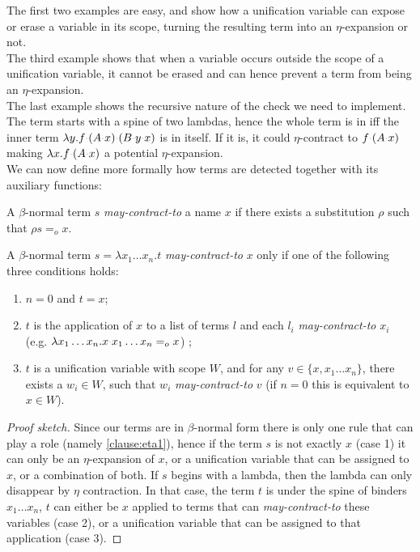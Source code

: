 \documentclass[sigconf,natbib=false,review]{acmart}
\newcommand{\appsep}{\ensuremath{\textcolor{lightgray}{\cdot}}}
\newcommand{\EqualRel}{\ensuremath{=}}
\newcommand{\Eo}{\ensuremath{\EqualRel_o}\xspace}
\begin{document}
\noindent
The first two examples are easy, and show how a unification variable can expose
or erase a variable in its scope, turning the resulting term into an $\eta$-expansion or not.\\
The third example shows that when a variable occurs outside the scope of a unification
variable, it cannot be erased and can hence prevent a term from being an $\eta$-expansion.\\
The last example shows the recursive nature of the check we need to implement.
The term starts with a spine of two lambdas, hence the whole term
is in \maybeeta iff the inner term $\lambda y.f\appsep (A \appsep x) \appsep (B \appsep y \appsep x)$
is in \maybeeta itself. If it is, it could $\eta$-contract to
$f \appsep (A \appsep x)$ making $\lambda x.f \appsep (A \appsep x)$ a potential
$\eta$-expansion.\\
We can now define more formally how \maybeeta terms are detected together with
its auxiliary functions:

\newcommand{\reduceto}{\emph{may-contract-to}}
\begin{definition}[\reduceto]
  A $\beta$-normal term $s$ \reduceto{} a name $x$ if there exists a
  substitution $\rho$ such that $\rho s \Eo{} x$.
\end{definition}

\begin{lemma}\label{lem:reduceto}
A $\beta$-normal term $s = \lambda x_1 \ldots x_n.t$
\reduceto{} $x$ only if one of the following three conditions holds:
\begin{enumerate}
  \item $n = 0$ and $t = x$;
  \item $t$ is the application of $x$ to a list
     of terms $l$ and each $l_i$ \reduceto{} $x_i$
     (e.g. $\lambda x_1 \ldots x_n.x \appsep x_1 \ldots x_n \Eo{} x$) ;
  \item $t$ is a unification variable with scope
    $W$, and for any $v \in \{ x, x_1 \ldots x_n \}$,
    there exists a $w_i \in W$, such that $w_i$ \reduceto{} $v$
    (if $n = 0$ this is equivalent to $x \in W$).
\end{enumerate}
\end{lemma}
\begin{proof}[Proof sketch]
Since our terms are in $\beta$-normal form there is only
one rule that can play a role (namely \ref{clause:eta1}),
hence if the term $s$ is not exactly $x$ (case 1)
it can only be an $\eta$-expansion of $x$, or a unification
variable that can be assigned to $x$, or a combination of both.
If $s$ begins with a lambda, then the lambda can only disappear by $\eta$
contraction. In that case, the term $t$ is under the spine of binders
$x_1\ldots x_n$, $t$ can either be $x$ applied to terms that can
\reduceto{} these variables (case 2), or a unification variable
that can be assigned to that application (case 3).
\end{proof}
\end{document}
